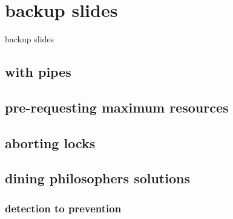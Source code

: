 

\section{backup slides}
\begin{frame}{}
\end{frame}
\begin{frame}{backup slides}
\end{frame}

\subsection{with pipes}


\subsection{pre-requesting maximum resources}



\subsection{aborting locks}



\subsection{dining philosophers solutions}



\subsubsection{detection to prevention}

